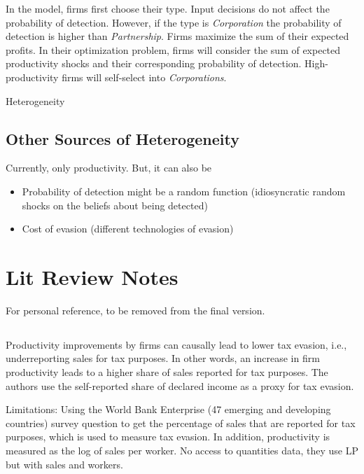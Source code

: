 \documentclass[
  12pt]{article}
\providecommand{\tightlist}{%
  \setlength{\itemsep}{0pt}\setlength{\parskip}{0pt}}\usepackage{longtable,booktabs,array}
\theoremstyle{definition}
\theoremstyle{remark}
\begin{document}
In the model, firms first choose their type. Input decisions do not
affect the probability of detection. However, if the type is
\emph{Corporation} the probability of detection is higher than
\emph{Partnership}. Firms maximize the sum of their expected profits. In
their optimization problem, firms will consider the sum of expected
productivity shocks and their corresponding probability of detection.
High-productivity firms will self-select into \emph{Corporations}.

\begin{anfxnote}{Heterogeneity}

\subsection{Other Sources of
Heterogeneity}\label{other-sources-of-heterogeneity}

Currently, only productivity. But, it can also be

\begin{itemize}
\tightlist
\item
  Probability of detection might be a random function (idiosyncratic
  random shocks on the beliefs about being detected)
\item
  Cost of evasion (different technologies of evasion)
\end{itemize}

\end{anfxnote}

\section{Lit Review Notes}\label{lit-review-notes}

For personal reference, to be removed from the final version.

\subsection{\texorpdfstring{\citet{Dabla2019}}{@Dabla2019}}\label{dabla2019}

Productivity improvements by firms can causally lead to lower tax
evasion, i.e., underreporting sales for tax purposes. In other words, an
increase in firm productivity leads to a higher share of sales reported
for tax purposes. The authors use the self-reported share of declared
income as a proxy for tax evasion.

Limitations: Using the World Bank Enterprise (47 emerging and developing
countries) survey question to get the percentage of sales that are
reported for tax purposes, which is used to measure tax evasion. In
addition, productivity is measured as the log of sales per worker. No
access to quantities data, they use LP but with sales and workers.
\end{document}
